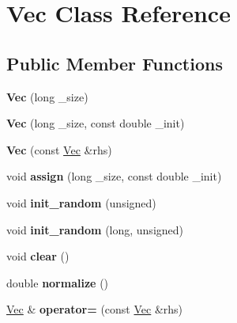 \hypertarget{classVec}{}\section{Vec Class Reference}
\label{classVec}
\subsection*{Public Member Functions}
\begin{DoxyCompactItemize}
\item 
{\bfseries Vec} (long \+\_\+size)\hypertarget{classVec_aebab4a32b6fd890bac3bb4ac0803000a}{}\label{classVec_aebab4a32b6fd890bac3bb4ac0803000a}

\item 
{\bfseries Vec} (long \+\_\+size, const double \+\_\+init)\hypertarget{classVec_a677cce187b9cdd48f87bb114e96a7f18}{}\label{classVec_a677cce187b9cdd48f87bb114e96a7f18}

\item 
{\bfseries Vec} (const \hyperlink{classVec}{Vec} \&rhs)\hypertarget{classVec_a81909697772bb0c9c21e84563118fd5e}{}\label{classVec_a81909697772bb0c9c21e84563118fd5e}

\item 
void {\bfseries assign} (long \+\_\+size, const double \+\_\+init)\hypertarget{classVec_a120192dd81c707083c3579372ea47bed}{}\label{classVec_a120192dd81c707083c3579372ea47bed}

\item 
void {\bfseries init\+\_\+random} (unsigned)\hypertarget{classVec_aa0d1a2202064a2b55efe1bdf5c6cab29}{}\label{classVec_aa0d1a2202064a2b55efe1bdf5c6cab29}

\item 
void {\bfseries init\+\_\+random} (long, unsigned)\hypertarget{classVec_aee89a807828fa09404834adb1f5507b0}{}\label{classVec_aee89a807828fa09404834adb1f5507b0}

\item 
void {\bfseries clear} ()\hypertarget{classVec_a3d89cd4aa378073a229f7bc6eb2b40b2}{}\label{classVec_a3d89cd4aa378073a229f7bc6eb2b40b2}

\item 
double {\bfseries normalize} ()\hypertarget{classVec_a22d5787f88ef4a6ead33c0857d3da697}{}\label{classVec_a22d5787f88ef4a6ead33c0857d3da697}

\item 
\hyperlink{classVec}{Vec} \& {\bfseries operator=} (const \hyperlink{classVec}{Vec} \&rhs)\hypertarget{classVec_a2432e72a4c830d7ae40d36fe843f8fa0}{}\label{classVec_a2432e72a4c830d7ae40d36fe843f8fa0}


\end{DoxyCompactItemize}
